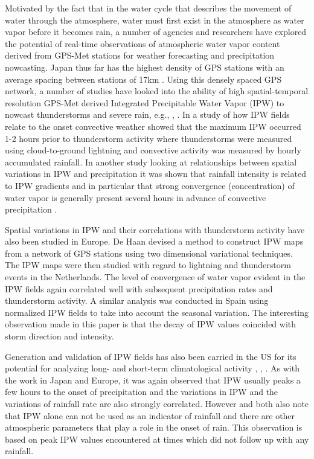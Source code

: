 \documentclass[proposal]{umassthesis}
\begin{document}
Motivated by the fact that in the water cycle that describes the movement of water through the atmosphere, water must first exist in the atmosphere as water vapor before it becomes rain, a number of agencies and researchers have explored the potential of real-time observations of atmospheric water vapor content derived from GPS-Met stations for weather forecasting and precipitation nowcasting. Japan thus far has the highest density of GPS stations with an average spacing between stations of 17km \cite{shoji2014estimation}. Using this densely spaced GPS network, a number of studies have looked into the ability of high spatial-temporal resolution GPS-Met derived Integrated Precipitable Water Vapor (IPW) to nowcast thunderstorms and severe rain, e.g., \cite{iwasaki2002diurnal}, \cite{seko2004meso}. In a study of how IPW fields relate to the onset convective weather \cite{inoue2007characteristics} showed that the maximum IPW occurred 1-2 hours prior to thunderstorm activity where thunderstorms were measured using cloud-to-ground lightning and convective activity was measured by hourly accumulated rainfall. In another study looking at relationships between spatial variations in IPW and precipitation it was shown that rainfall intensity is related to IPW gradients and in particular that strong convergence (concentration) of water vapor is generally present several hours in advance of convective precipitation \cite{yoshinori2013retrieval}.

Spatial variations in IPW and their correlations with thunderstorm activity have also been studied in Europe. De Haan \cite{de2009real} devised a method to construct IPW maps from a network of GPS stations using two dimensional variational techniques. The IPW maps were then studied with regard to lightning and thunderstorm events in the Netherlands. The level of convergence of water vapor evident in the IPW fields again correlated well with subsequent precipitation rates and thunderstorm activity. A similar analysis was conducted in Spain \cite{terradellas2010use} using normalized IPW fields to take into account the seasonal variation. The interesting observation made in this paper is that the decay of IPW values coincided with storm direction and intensity.

Generation and validation of IPW fields has also been carried in the US for its potential for analyzing long- and short-term climatological activity \cite{radhakrishna2015precipitable}, \cite{shi2015real},  \cite{akilan2015gps}. As with the work in Japan and Europe, it was again observed that IPW usually peaks a few hours to the onset of precipitation and the variations in IPW and the variations of rainfall rate are also strongly correlated. However \cite{shi2015real} and \cite{akilan2015gps} both also note that IPW alone can not be used as an indicator of rainfall and there are other atmospheric parameters that play a role in the onset of rain. This observation is based on peak IPW values encountered at times which did not follow up with any rainfall.
\end{document}
